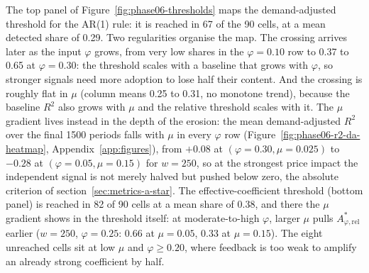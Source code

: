 \documentclass[12pt]{article}
\begin{document}
The top panel of Figure~\ref{fig:phase06-thresholds} maps the demand-adjusted threshold for the AR(1) rule: it is reached in 67 of the 90 cells, at a mean detected share of 0.29. %
Two regularities organise the map. The crossing arrives later as the input $\varphi$ grows, from very low shares in the $\varphi=0.10$ row to 0.37 to 0.65 at $\varphi=0.30$: the threshold scales with a baseline that grows with $\varphi$, so stronger signals need more adoption to lose half their content. %
And the crossing is roughly flat in $\mu$ (column means 0.25 to 0.31, no monotone trend), because the baseline $R^{2}$ also grows with $\mu$ and the relative threshold scales with it. %
The $\mu$ gradient lives instead in the depth of the erosion: the mean demand-adjusted $R^{2}$ over the final 1500 periods falls with $\mu$ in every $\varphi$ row (Figure~\ref{fig:phase06-r2-da-heatmap}, Appendix~\ref{app:figures}), from $+0.08$ at $(\varphi=0.30,\mu=0.025)$ to $-0.28$ at $(\varphi=0.05,\mu=0.15)$ for $w=250$, so at the strongest price impact the independent signal is not merely halved but pushed below zero, the absolute criterion of section~\ref{sec:metrics-a-star}. %
The effective-coefficient threshold (bottom panel) is reached in 82 of 90 cells at a mean share of 0.38, and there the $\mu$ gradient shows in the threshold itself: at moderate-to-high $\varphi$, larger $\mu$ pulls $A^{*}_{\varphi,\mathrm{rel}}$ earlier ($w=250$, $\varphi=0.25$: 0.66 at $\mu=0.05$, 0.33 at $\mu=0.15$). The eight unreached cells sit at low $\mu$ and $\varphi\geq0.20$, where feedback is too weak to amplify an already strong coefficient by half. %
\end{document}
